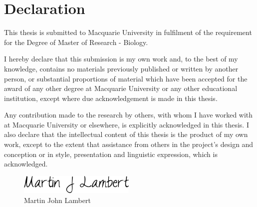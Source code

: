 \chapter*{Declaration}
This thesis is submitted to Macquarie University in fulfilment of the requirement for the Degree of Master of Research - Biology.

\vspace{1em}
I hereby declare that this submission is my own work and, to the best of my knowledge, contains no materials previously published or written by another person, or substantial proportions of material which have been accepted for the award of any other degree at Macquarie University or any other educational institution, except where due acknowledgement is made in this thesis.

\vspace{1em}
Any contribution made to the research by others, with whom I have worked with at Macquarie University or elsewhere, is explicitly acknowledged in this thesis. I also declare that the intellectual content of this thesis is the product of my own work, except to the extent that assistance from others in the project's design and conception or in style, presentation and linguistic expression, which is acknowledged.

\vspace{1em}
\begin{figure}[h!]
  \raggedleft
  \includegraphics[width = 15em]{../img/my_signature.png}\\
  Martin John Lambert
\end{figure}
